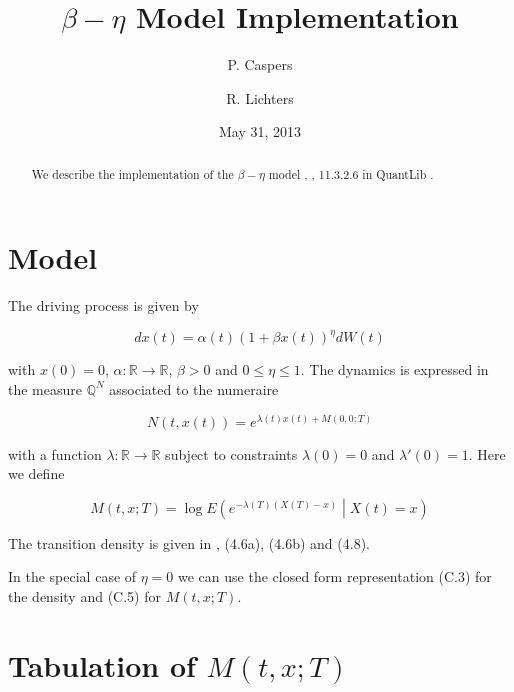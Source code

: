\documentclass{amsart}
\theoremstyle{plain}
\numberwithin{equation}{section}
\begin{document}
\title[$\beta-\eta$ Model Implementation]{$\beta-\eta$ Model Implementation}
\author{P. Caspers}
\author{R. Lichters}
\date{May 31, 2013}
\begin{abstract}
We describe the implementation of the $\beta-\eta$ model \cite{betaeta}, \cite{piterbarg}, 11.3.2.6 in QuantLib \cite{ql}.
\end{abstract}

\maketitle

\section{Model}

The driving process is given by

\begin{equation}
dx(t) = \alpha(t) ( 1 + \beta x(t) )^\eta dW(t) 
\end{equation}

with $x(0)=0$, $\alpha:\mathbb{R}\rightarrow\mathbb{R}$, $\beta > 0$ and $0 \leq \eta \leq 1$. The dynamics is expressed in the measure $\mathbb{Q}^N$ associated to the numeraire

\begin{equation}
N(t,x(t)) = e^{\lambda(t)x(t)+M(0,0;T)}
\end{equation}

with a function $\lambda: \mathbb{R}\rightarrow\mathbb{R}$ subject to constraints $\lambda(0)=0$ and $\lambda'(0)=1$. Here we define

\begin{equation}\label{formula_M}
M(t,x;T) = \log E \left( e^{-\lambda(T)(X(T)-x)} \middle | X(t)=x \right)
\end{equation}

The transition density is given in \cite{betaeta}, (4.6a), (4.6b) and (4.8). 

In the special case of $\eta=0$ we can use the closed form representation (C.3) for the density and (C.5) for $M(t,x;T)$.

\section{Tabulation of $M(t,x;T)$}
\end{document}
